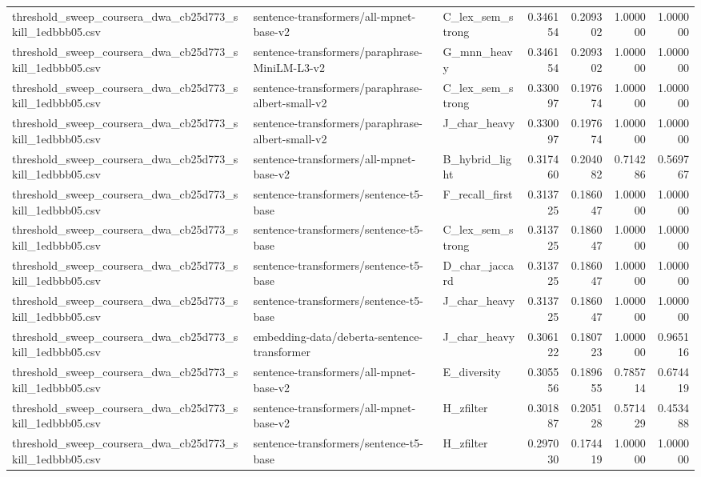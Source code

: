 \begin{table}[!ht]
\begin{tabular}{lllrrrr}
threshold\_sweep\_coursera\_dwa\_cb25d773\_skill\_1edbbb05.csv & sentence-transformers/all-mpnet-base-v2 & C\_lex\_sem\_strong & 0.346154 & 0.209302 & 1.000000 & 1.000000 \\
threshold\_sweep\_coursera\_dwa\_cb25d773\_skill\_1edbbb05.csv & sentence-transformers/paraphrase-MiniLM-L3-v2 & G\_mnn\_heavy & 0.346154 & 0.209302 & 1.000000 & 1.000000 \\
threshold\_sweep\_coursera\_dwa\_cb25d773\_skill\_1edbbb05.csv & sentence-transformers/paraphrase-albert-small-v2 & C\_lex\_sem\_strong & 0.330097 & 0.197674 & 1.000000 & 1.000000 \\
threshold\_sweep\_coursera\_dwa\_cb25d773\_skill\_1edbbb05.csv & sentence-transformers/paraphrase-albert-small-v2 & J\_char\_heavy & 0.330097 & 0.197674 & 1.000000 & 1.000000 \\
threshold\_sweep\_coursera\_dwa\_cb25d773\_skill\_1edbbb05.csv & sentence-transformers/all-mpnet-base-v2 & B\_hybrid\_light & 0.317460 & 0.204082 & 0.714286 & 0.569767 \\
threshold\_sweep\_coursera\_dwa\_cb25d773\_skill\_1edbbb05.csv & sentence-transformers/sentence-t5-base & F\_recall\_first & 0.313725 & 0.186047 & 1.000000 & 1.000000 \\
threshold\_sweep\_coursera\_dwa\_cb25d773\_skill\_1edbbb05.csv & sentence-transformers/sentence-t5-base & C\_lex\_sem\_strong & 0.313725 & 0.186047 & 1.000000 & 1.000000 \\
threshold\_sweep\_coursera\_dwa\_cb25d773\_skill\_1edbbb05.csv & sentence-transformers/sentence-t5-base & D\_char\_jaccard & 0.313725 & 0.186047 & 1.000000 & 1.000000 \\
threshold\_sweep\_coursera\_dwa\_cb25d773\_skill\_1edbbb05.csv & sentence-transformers/sentence-t5-base & J\_char\_heavy & 0.313725 & 0.186047 & 1.000000 & 1.000000 \\
threshold\_sweep\_coursera\_dwa\_cb25d773\_skill\_1edbbb05.csv & embedding-data/deberta-sentence-transformer & J\_char\_heavy & 0.306122 & 0.180723 & 1.000000 & 0.965116 \\
threshold\_sweep\_coursera\_dwa\_cb25d773\_skill\_1edbbb05.csv & sentence-transformers/all-mpnet-base-v2 & E\_diversity & 0.305556 & 0.189655 & 0.785714 & 0.674419 \\
threshold\_sweep\_coursera\_dwa\_cb25d773\_skill\_1edbbb05.csv & sentence-transformers/all-mpnet-base-v2 & H\_zfilter & 0.301887 & 0.205128 & 0.571429 & 0.453488 \\
threshold\_sweep\_coursera\_dwa\_cb25d773\_skill\_1edbbb05.csv & sentence-transformers/sentence-t5-base & H\_zfilter & 0.297030 & 0.174419 & 1.000000 & 1.000000 \\

\end{tabular}
\end{table}
